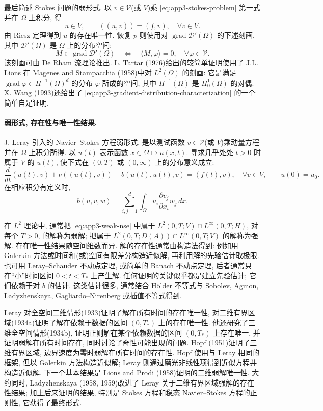 最后简述 Stokes 问题的弱形式. 以 $v\in\mathcal V$(或 $V$)乘 
\eqref{eq:app3-stokes-problem} 第一式并在 $\Omega$ 上积分, 得
\[
u\in V,
\qquad ((u,v))=(f,v),
\quad\forall v\in V.
\]
由 Riesz 定理得到 $u$ 的存在唯一性. 恢复 $p$ 则使用对 $\operatorname{grad}\mathcal D'(\Omega)$ 的下述刻画, 其中 $\mathcal D'(\Omega)$ 是 $\Omega$ 上的分布空间:
\begin{equation}
M\in\operatorname{grad}\mathcal D'(\Omega)
\quad\Longleftrightarrow\quad
\langle M,\varphi\rangle=0,
\quad\forall\varphi\in\mathcal V.
\label{eq:app3-gradient-distribution-characterization}
\end{equation}
该刻画可由 De Rham 流理论推出. L. Tartar (1976)给出的较简单证明使用了 J.L. Lions 在 Magenes and Stampacchia (1958)中对 $L^2(\Omega)$ 的刻画: 它是满足 $\operatorname{grad}\varphi\in H^{-1}(\Omega)^d$ 的分布 $\varphi$ 所成的空间, 其中 $H^{-1}(\Omega)$ 是 $H_0^1(\Omega)$ 的对偶. X. Wang (1993)还给出了 
\eqref{eq:app3-gradient-distribution-characterization} 的一个简单自足证明.

\hypertarget{appendix-03-page-358}{}
\paragraph{弱形式, 存在性与唯一性结果.}
J. Leray 引入的 Navier--Stokes 方程弱形式, 是以测试函数 $v\in\mathcal V$(或 $V$)乘动量方程并在 $\Omega$ 上积分所得. 以 $u(t)$ 表示函数 $x\in\Omega\mapsto u(x,t)$. 寻求几乎处处 $t>0$ 时属于 $V$ 的 $u(t)$, 使下式在 $(0,T)$ 或 $(0,\infty)$ 上的分布意义成立:
\begin{equation}
\frac d{dt}(u(t),v)+\nu((u(t),v))+b(u(t),u(t),v)=(f(t),v),
\quad\forall v\in V,
\qquad u(0)=u_0.
\label{eq:app3-weak-nse}
\end{equation}
在相应积分有定义时,
\[
b(u,v,w)=\sum_{i,j=1}^d\int_\Omega u_i\frac{\partial v_j}{\partial x_i}w_j\,dx.
\]

在 $L^2$ 理论中, 通常把 
\eqref{eq:app3-weak-nse} 中属于 $L^2(0,T;V)\cap L^\infty(0,T;H)$, 对每个 $T>0$, 的解称为弱解; 把属于 $L^2(0,T;D(A))\cap L^\infty(0,T;V)$ 的解称为强解. 存在唯一性结果随空间维数而异. 解的存在性通常由构造法得到: 例如用 Galerkin 方法或时间和(或)空间有限差分构造近似解, 再利用解的先验估计取极限. 也可用 Leray--Schauder 不动点定理, 或简单的 Banach 不动点定理, 后者通常只在``小''时间区间 $0<t<T_*$ 上产生解. 任何证明的关键似乎都是建立先验估计; 它们依赖于对 $b$ 的估计. 这类估计很多, 通常结合 Hölder 不等式与 Sobolev, Agmon, Ladyzhenskaya, Gagliardo--Nirenberg 或插值不等式得到.

Leray 对全空间二维情形(1933)证明了解在所有时间的存在唯一性, 对二维有界区域(1934a)证明了解在依赖于数据的区间 $(0,T_*)$ 上的存在唯一性. 他还研究了三维全空间情形(1934b), 证明正则解在某个依赖数据的区间 $(0,T_*)$ 上存在唯一, 并证明弱解在所有时间存在, 同时讨论了奇性可能出现的问题. Hopf (1951)证明了三维有界区域, 边界速度为零时弱解在所有时间的存在性. Hopf 使用与 Leray 相同的框架, 但以 Galerkin 方法构造近似解; Leray 则通过磨光非线性项得到近似方程并构造近似解. 下一个基本结果是 Lions and Prodi (1958)证明的二维弱解唯一性. 大约同时, Ladyzhenskaya (1958, 1959)改进了 Leray 关于二维有界区域强解的存在性结果; 加上后来证明的结果, 特别是 Stokes 方程和稳态 Navier--Stokes 方程的正则性, 它获得了最终形式.

